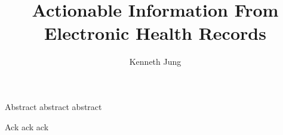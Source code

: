 \documentclass[12pt]{report}
\title{Actionable Information From Electronic Health Records}
\author{Kenneth Jung}
\begin{document}

    \beforepreface

Abstract abstract abstract

Ack ack ack

    \afterpreface 















\onlinesignature
\end{document}
